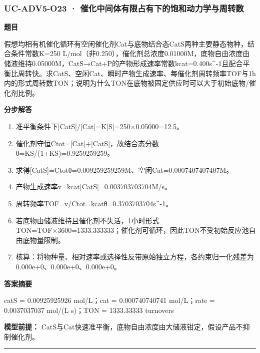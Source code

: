 \documentclass[UTF8,11pt,a4paper]{ctexart}
\begin{document}
\subsubsection*{UC-ADV5-O23 · 催化中间体有限占有下的饱和动力学与周转数}
\noindent\textbf{题目}\par
假想均相有机催化循环有空闲催化剂Cat与底物结合态CatS两种主要静态物种，结合条件常数K=250 L/mol（非0.250），催化剂总浓度0.01000M，底物自由浓度由储液维持0.05000M，CatS→Cat+P的产物形成速率常数kcat=0.400s\textasciicircum{}-1且配合平衡比周转快。求CatS、空闲Cat、瞬时产物生成速率、每催化剂周转频率TOF与1h内的形式周转数TON；说明为什么TON在底物被固定供应时可以大于初始底物/催化剂比例。\par
\medskip\noindent\textbf{分步解答}
\begin{enumerate}
\item 准平衡条件下[CatS]/[Cat]=K[S]=250×0.05000=12.5。
\item 催化剂守恒Ctot=[Cat]+[CatS]，故结合态分数θ=KS/(1+KS)=0.9259259259。
\item 求得[CatS]=Ctotθ=0.009259259259M、空闲Cat=0.0007407407407M。
\item 产物生成速率v=kcat[CatS]=0.003703703704M/s。
\item 周转频率TOF=v/Ctot=kcatθ=0.3703703704s\textasciicircum{}-1。
\item 若底物由储液维持且催化剂不失活，1小时形式TON=TOF×3600=1333.333333；催化剂可循环，因此TON不受初始反应池自由底物量限制。
\item 核算：将物种量、相对速率或选择性反带原始独立方程，各约束归一化残差为 0.000e+0、0.000e+0、0.000e+0。
\end{enumerate}
\noindent\textbf{答案摘要}\par
catS = 0.00925925926 mol/L；cat = 0.000740740741 mol/L；rate = 0.0037037037 mol/(L s)；TON = 1333.33333 turnovers\par
\noindent\textbf{模型前提：}
CatS与Cat快速准平衡，底物自由浓度由大储液钳定，假设产品不抑制催化剂。\par
\medskip\hrule\medskip
{}
\end{document}
